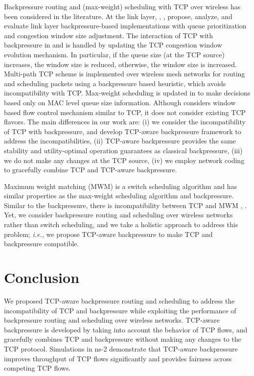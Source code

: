 \documentclass[conference]{IEEEtran}
\newcommand{\ie}{{\em i.e., }}
\begin{document}
Backpressure routing and (max-weight) scheduling with TCP over wireless has been considered in the literature. At the link layer, \cite{DiffQ}, \cite{umut_stolyar}, propose, analyze, and evaluate link layer backpressure-based implementations with queue prioritization and congestion window size adjustment. The interaction of TCP with backpressure in \cite{DiffQ} and \cite{umut_stolyar} is handled by updating the TCP congestion window evolution mechanism. In particular, if the queue size (at the TCP source) increases, the window size is reduced, otherwise, the window size is increased. Multi-path TCP scheme is implemented over wireless mesh networks \cite{horizon} for routing and scheduling packets using a backpressure based heuristic, which avoids incompatibility with TCP. Max-weight scheduling is updated in \cite{ghaderi_tcp_theoric} to make decisions based only on MAC level queue size information. Although \cite{ghaderi_tcp_theoric} considers window based flow control mechanism similar to TCP, it does not consider existing TCP flavors. The main differences in our work are: (i) we consider the incompatibility of TCP with backpressure, and develop TCP-aware backpressure framework to address the incompatibilities, (ii) TCP-aware backpressure provides the same stability and utility-optimal operation guarantees as classical backpressure, (iii) we do not make any changes at the TCP source, (iv) we employ network coding to gracefully combine TCP and TCP-aware backpressure.



Maximum weight matching (MWM) is a switch scheduling algorithm and has similar properties as the max-weight scheduling algorithm and backpressure. Similar to the backpressure, there is incompatibility between TCP and MWM \cite{TCP_MWM_switch1}, \cite{TCP_MWM_switch2}. Yet, we consider backpressure routing and scheduling over wireless networks rather than switch scheduling, and we take a holistic approach to address this problem; \ie we propose TCP-aware backpressure to make TCP and backpressure compatible.








\section{Conclusion}\label{sec:conclusion}
We proposed TCP-aware backpressure routing and scheduling to address the incompatibility of TCP and backpressure while exploiting the performance of backpressure routing and scheduling over wireless networks. TCP-aware backpressure is developed by taking into account the behavior of TCP flows, and gracefully combines TCP and backpressure without making any changes to the TCP protocol. Simulations in ns-2 demonstrate that TCP-aware backpressure improves throughput of TCP flows significantly and provides fairness across competing TCP flows.
\end{document}
